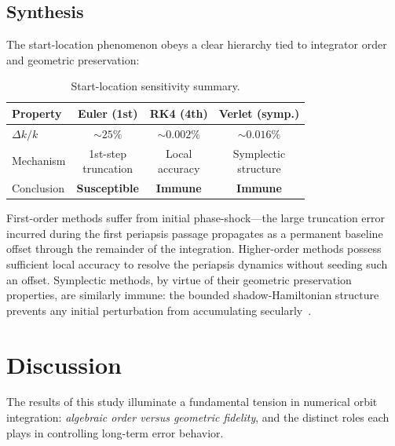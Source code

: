 \documentclass[twocolumn, 10pt]{article}
\begin{document}
\subsection{Synthesis}

The start-location phenomenon obeys a clear hierarchy tied to integrator order and geometric preservation:

\begin{table}[H]
\centering
\caption{Start-location sensitivity summary.}
\label{tab:start_location}
\begin{tabular}{@{}lccc@{}}
\toprule
Property & Euler (1st) & RK4 (4th) & Verlet (symp.) \\
\midrule
$\Delta k / k$ & ${\sim}25\%$ & ${\sim}0.002\%$ & ${\sim}0.016\%$ \\
Mechanism & \parbox{2cm}{\centering 1st-step \\ truncation} & \parbox{2cm}{\centering Local \\ accuracy} & \parbox{2cm}{\centering Symplectic \\ structure} \\
Conclusion & \textbf{Susceptible} & \textbf{Immune} & \textbf{Immune} \\
\bottomrule
\end{tabular}
\end{table}

First-order methods suffer from initial phase-shock---the large truncation error incurred during the first periapsis passage propagates as a permanent baseline offset through the remainder of the integration. Higher-order methods possess sufficient local accuracy to resolve the periapsis dynamics without seeding such an offset. Symplectic methods, by virtue of their geometric preservation properties, are similarly immune: the bounded shadow-Hamiltonian structure prevents any initial perturbation from accumulating secularly~\cite{rein2019}.

\section{Discussion}

The results of this study illuminate a fundamental tension in numerical orbit integration: \textit{algebraic order versus geometric fidelity}, and the distinct roles each plays in controlling long-term error behavior.
\end{document}
